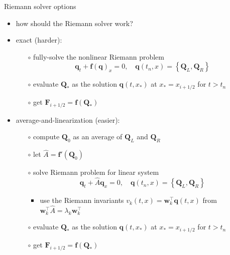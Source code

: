 \documentclass[10pt,hyperref,dvipsnames]{beamer}
\newcommand{\bbf}{\mathbf{f}}
\newcommand{\bq}{\mathbf{q}}
\newcommand{\bw}{\mathbf{w}}
\newcommand{\bF}{\mathbf{F}}
\newcommand{\bQ}{\mathbf{Q}}
\begin{document}
\begin{frame}{Riemann solver options}

\begin{itemize}
\item how should the Riemann solver work?
\item \alert{exact (harder)}:
    \begin{itemize}
    \item[$\circ$] fully-solve the nonlinear Riemann problem
    $$\bq_t + \bbf(\bq)_x = 0, \quad \bq(t_n,x) = \left\{\bQ_L, \bQ_R\right\}$$
    \item[$\circ$] evaluate $\bQ_*$ as the solution $\bq(t,x_*)$ at $x_*=x_{i+1/2}$ for $t>t_n$
    \item[$\circ$] get $\bF_{i+1/2} = \bbf(\bQ_*)$
    \end{itemize}
\item \alert{average-and-linearization (easier)}:
    \begin{itemize}
    \item[$\circ$] compute $\bQ_0$ as an average of $\bQ_L$ and $\bQ_R$
    \item[$\circ$] let $\hat A = \bbf'(\bQ_0)$
    \item[$\circ$] solve Riemann problem for linear system
    $$\bq_t + \hat A \bq_x = 0, \quad \bq(t_n,x) = \left\{\bQ_L, \bQ_R\right\}$$

        \begin{itemize}
        \item use the Riemann invariants $v_k(t,x) = \bw_k^\top \bq(t,x)$ from $\bw_k^\top \hat A = \lambda_k \bw_k^\top$
        \end{itemize}
    \item[$\circ$] evaluate $\bQ_*$ as the solution $\bq(t,x_*)$ at $x_*=x_{i+1/2}$ for $t>t_n$
    \item[$\circ$] get $\bF_{i+1/2} = \bbf(\bQ_*)$
    \end{itemize}
\end{itemize}
\end{frame}
\end{document}
